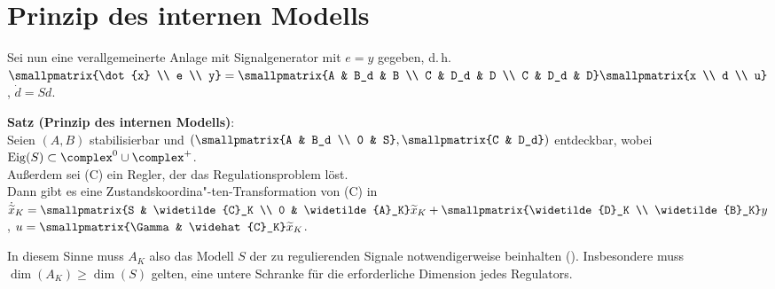 \pagebreak

\section{%
    Prinzip des internen Modells%
}

Sei nun eine verallgemeinerte Anlage mit Signalgenerator mit $e = y$ gegeben, d.\,h.\\
$\smallpmatrix{\dot{x} \\ e \\ y} = \smallpmatrix{A & B_d & B \\ C & D_d & D \\ C & D_d & D}
\smallpmatrix{x \\ d \\ u}$, $\dot{d} = Sd$.

\textbf{Satz (Prinzip des internen Modells)}:\\
Seien $(A, B)$ stabilisierbar und
$\left(\smallpmatrix{A & B_d \\ 0 & S}, \smallpmatrix{C & D_d}\right)$ entdeckbar,
wobei $\Eig(S) \subset \complex^0 \cup \complex^+$.\\
Außerdem sei (C) ein Regler, der das Regulationsproblem löst.\\
Dann gibt es eine Zustandskoordina"-ten-Transformation von (C) in\\
$\dotwidetilde{x}_K = \smallpmatrix{S & \widetilde{C}_K \\ 0 & \widetilde{A}_K} \widetilde{x}_K
+ \smallpmatrix{\widetilde{D}_K \\ \widetilde{B}_K} y$,
$u = \smallpmatrix{\Gamma & \widehat{C}_K} \widetilde{x}_K$.

In diesem Sinne muss $A_K$ also das Modell $S$ der zu regulierenden Signale
notwendigerweise beinhalten
().
Insbesondere muss $\dim(A_K) \ge \dim(S)$ gelten, eine untere Schranke für die erforderliche
Dimension jedes Regulators.

\linie

